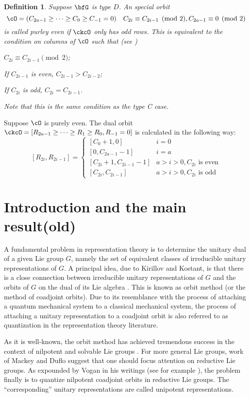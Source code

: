 \documentclass[12pt,a4paper]{amsart}
\numberwithin{equation}{section}
\newtheorem{defn}[thm]{Definition}
\theoremstyle{remark}
\begin{document}
{\begin{defn}
  Suppose $\bfG$ is type $D$.  An special orbit
  \[
    \cO=(C_{2a-1}\ge\dots \ge C_0\geq C_{-1}=0) \quad C_{2i}\equiv
    C_{2i-1}\pmod{2}, C_{2a-1} \equiv 0 \pmod{2}
  \]
  is called purley even if
  $\ckcO$ only has odd rows.
  This is equivalent to the condition on columns of $\cO$ such that (see )
  \begin{enumC}
  \item $C_{2i} \equiv C_{2i-1} \pmod{2}$; 
  \item 
   If $C_{2i-1}$ is even,  $C_{2i-1} > C_{2i-2}$; 
  \item
    If $C_{2i}$ is odd, $C_{2i}=C_{2i-1}$. 
  \end{enumC}
  Note that this is the same condition as the type C case. 
\end{defn}


Suppose $\cO$ is purely even. 
The dual orbit 
$\ckcO = [R_{2a-1}\geq \cdots \geq R_1\geq R_0, R_{-1}=0]$
is calculated in the following way: 
\[
  [R_{2i},R_{2i-1}] = \begin{cases}
    [C_0+1, 0] & i=0\\
    [0, C_{2a-1}-1] & i = a \\
    [C_{2i}+1, C_{2i-1}-1] & a> i>0, C_{2i} \text{ is even} \\
    [C_{2i},C_{2i-1}] & a>i>0, C_{2i} \text{ is odd}
  \end{cases}
\]
}

\section{Introduction and the main result(old)}\label{sec:intro}

A fundamental problem in representation theory is to determine the
unitary dual of a given Lie group $G$, namely the set of equivalent classes of irreducible unitary representations
of $G$. A principal idea, due to Kirillov and Kostant, is that there is a close connection between irreducible unitary representations of $G$ and the orbits of $G$ on the dual of its Lie algebra \cite{Ki62,Ko70}. This is known as orbit method (or the method of coadjoint orbits). Due to its resemblance with the process of attaching a quantum mechanical system to a classical mechanical system, the process of attaching a unitary representation to a coadjoint orbit is also referred to as quantization in the representation theory literature.

As it is well-known, the orbit method has achieved tremendous success in the context of nilpotent and solvable Lie groups \cite{Ki62,AK}. For more general Lie groups, work of Mackey and Duflo \cite{Ma,Du82} suggest that one should focus attention on reductive Lie groups. As expounded by Vogan in his writings (see for example \cite{VoBook,Vo98,Vo00}), the problem finally is to quantize nilpotent coadjoint orbits in reductive Lie groups. The ``corresponding'' unitary representations are called unipotent representations.
\end{document}

